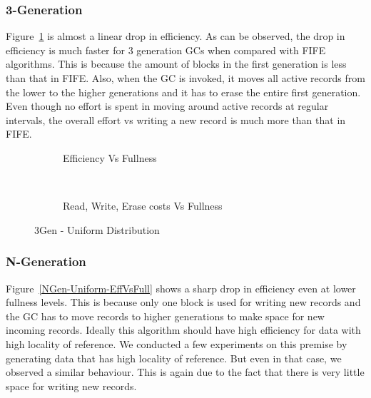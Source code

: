 \subsubsection{3-Generation}

Figure~\ref{3Gen-Uniform-EffVsFull} is almost a linear drop in efficiency. As can be observed, the drop in efficiency is much faster for 3 generation GCs when compared with FIFE algorithms. This is because the amount of blocks in the first generation is less than that in FIFE. Also, when the GC is invoked, it moves all active records from the lower to the higher generations and it has to erase the entire first generation. Even though no effort is spent in moving around active records at regular intervals, the overall effort vs writing a new record is much more than that in FIFE.

\begin{figure}[H]
        \centering
        \begin{subfigure}[b]{0.4\textwidth}
                \centering
                \caption{Efficiency Vs Fullness} \label{3Gen-Uniform-EffVsFull}
        \end{subfigure}
        ~~~ %
        \begin{subfigure}[b]{0.4\textwidth}
                \centering
                \caption{Read, Write, Erase costs Vs Fullness} \label{3Gen-Uniform-RdWrEraseVsFull}
        \end{subfigure}
        \caption{3Gen - Uniform Distribution}
\end{figure}


\subsubsection{N-Generation}

Figure~\ref{NGen-Uniform-EffVsFull} shows a sharp drop in efficiency even at lower fullness levels. This is because only one block is used for writing new records and the GC has to move records to higher generations to make space for new incoming records. Ideally this algorithm should have high efficiency for data with high locality of reference. We conducted a few experiments on this premise by generating data that has high locality of reference. But even in that case, we observed a similar behaviour. This is again due to the fact that there is very little space for writing new records.

